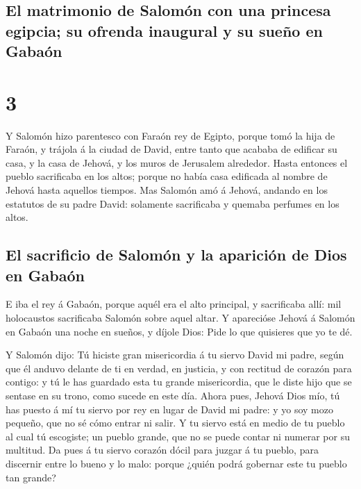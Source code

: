 \hypertarget{el-matrimonio-de-salomuxf3n-con-una-princesa-egipcia-su-ofrenda-inaugural-y-su-sueuxf1o-en-gabauxf3n}{%
\subsection{El matrimonio de Salomón con una princesa egipcia; su
ofrenda inaugural y su sueño en
Gabaón}\label{el-matrimonio-de-salomuxf3n-con-una-princesa-egipcia-su-ofrenda-inaugural-y-su-sueuxf1o-en-gabauxf3n}}

\hypertarget{section-11-3}{%
\section{3}\label{section-11-3}}

 Y Salomón hizo parentesco con Faraón rey de Egipto,
porque tomó la hija de Faraón, y trájola á la ciudad de David, entre
tanto que acababa de edificar su casa, y la casa de Jehová, y los muros
de Jerusalem alrededor.  Hasta entonces el pueblo
sacrificaba en los altos; porque no había casa edificada al nombre de
Jehová hasta aquellos tiempos.  Mas Salomón amó á Jehová,
andando en los estatutos de su padre David: solamente sacrificaba y
quemaba perfumes en los altos.

\hypertarget{el-sacrificio-de-salomuxf3n-y-la-apariciuxf3n-de-dios-en-gabauxf3n}{%
\subsection{El sacrificio de Salomón y la aparición de Dios en
Gabaón}\label{el-sacrificio-de-salomuxf3n-y-la-apariciuxf3n-de-dios-en-gabauxf3n}}

 E iba el rey á Gabaón, porque aquél era el alto
principal, y sacrificaba allí: mil holocaustos sacrificaba Salomón sobre
aquel altar.  Y aparecióse Jehová á Salomón en Gabaón una
noche en sueños, y díjole Dios: Pide lo que quisieres que yo te dé.

 Y Salomón dijo: Tú hiciste gran misericordia á tu siervo
David mi padre, según que él anduvo delante de ti en verdad, en
justicia, y con rectitud de corazón para contigo: y tú le has guardado
esta tu grande misericordia, que le diste hijo que se sentase en su
trono, como sucede en este día.  Ahora pues, Jehová Dios
mío, tú has puesto á mí tu siervo por rey en lugar de David mi padre: y
yo soy mozo pequeño, que no sé cómo entrar ni salir.  Y tu
siervo está en medio de tu pueblo al cual tú escogiste; un pueblo
grande, que no se puede contar ni numerar por su multitud.
 Da pues á tu siervo corazón dócil para juzgar á tu
pueblo, para discernir entre lo bueno y lo malo: porque ¿quién podrá
gobernar este tu pueblo tan grande?

